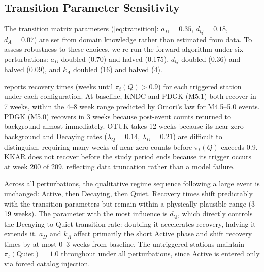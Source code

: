 \subsection{Transition Parameter Sensitivity}
\label{app:hmm_sensitivity}

The transition matrix parameters (\cref{eq:transition}: $a_D = 0.35$, $d_Q = 0.18$, $d_A = 0.07$) are set 
from domain knowledge rather than estimated from data. To assess robustness to these 
choices, we re-run the forward algorithm under six perturbations: $a_D$ doubled (0.70) 
and halved (0.175), $d_Q$ doubled (0.36) and halved (0.09), and $k_A$ doubled (16) 
and halved (4).

 reports recovery times (weeks until $\pi_t(Q) > 0.9$) for 
each triggered station under each configuration. At baseline, KNDC and PDGK (M5.1) 
both recover in 7 weeks, within the 4--8 week range predicted by Omori's law for 
M4.5--5.0 events. PDGK (M5.0) recovers in 3 weeks because post-event counts returned 
to background almost immediately. OTUK takes 12 weeks because its near-zero background 
and Decaying rates ($\lambda_Q = 0.14$, $\lambda_D = 0.21$) are difficult to 
distinguish, requiring many weeks of near-zero counts before $\pi_t(Q)$ exceeds 0.9. 
KKAR does not recover before the study period ends because its trigger occurs at week 
200 of 209, reflecting data truncation rather than a model failure.

\medskip
Across all perturbations, the qualitative regime sequence following a large event is 
unchanged: Active, then Decaying, then Quiet. Recovery times shift predictably with 
the transition parameters but remain within a physically plausible range (3--19 weeks). 
The parameter with the most influence is $d_Q$, which directly controls the 
Decaying-to-Quiet transition rate: doubling it accelerates recovery, halving it 
extends it. $a_D$ and $k_A$ affect primarily the short Active phase and shift recovery 
times by at most 0--3 weeks from baseline. The untriggered stations maintain 
$\pi_t(\text{Quiet}) = 1.0$ throughout under all perturbations, since Active is 
entered only via forced catalog injection.

